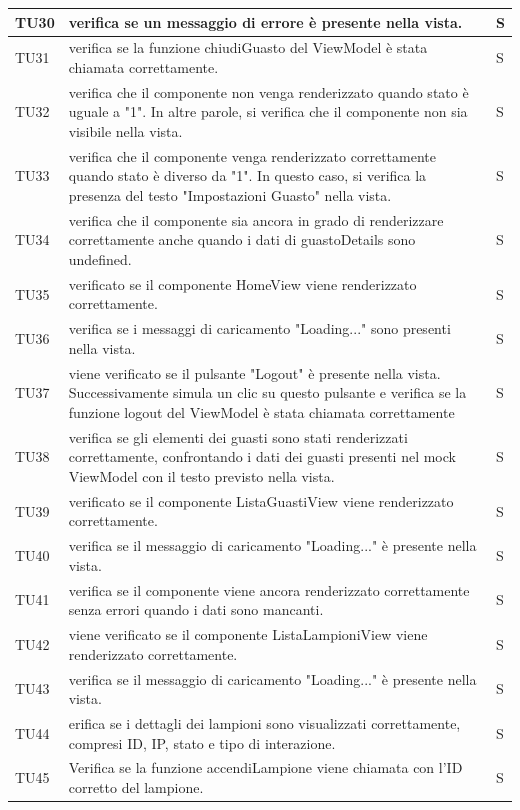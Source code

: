 \documentclass[12pt]{article}
\begin{document}
\begin{xltabular}{\linewidth}{|>{\hsize}X|X|>{\hsize}X|}
	TU30 & verifica se un messaggio di errore è presente nella vista. & S \\ \hline
	TU31 & verifica se la funzione chiudiGuasto del ViewModel è stata chiamata correttamente. & S \\ \hline
	TU32 & verifica che il componente non venga renderizzato quando stato è uguale a "1". In altre parole, si verifica che il componente non sia visibile nella vista. & S \\ \hline
	TU33 & verifica che il componente venga renderizzato correttamente quando stato è diverso da "1". In questo caso, si verifica la presenza del testo "Impostazioni Guasto" nella vista. & S \\ \hline
	TU34 & verifica che il componente sia ancora in grado di renderizzare correttamente anche quando i dati di guastoDetails sono undefined. & S \\ \hline
	TU35 & verificato se il componente HomeView viene renderizzato correttamente. & S \\ \hline
	TU36 & verifica se i messaggi di caricamento "Loading..." sono presenti nella vista. & S \\ \hline
	TU37 & viene verificato se il pulsante "Logout" è presente nella vista. Successivamente simula un clic su questo pulsante e verifica se la funzione logout del ViewModel è stata chiamata correttamente & S \\ \hline
	TU38 & verifica se gli elementi dei guasti sono stati renderizzati correttamente, confrontando i dati dei guasti presenti nel mock ViewModel con il testo previsto nella vista. & S \\ \hline
	TU39 & verificato se il componente ListaGuastiView viene renderizzato correttamente. & S \\ \hline
	TU40 &  verifica se il messaggio di caricamento "Loading..." è presente nella vista. & S \\ \hline
	TU41 & verifica se il componente viene ancora renderizzato correttamente senza errori quando i dati sono mancanti. & S \\ \hline
	TU42 & viene verificato se il componente ListaLampioniView viene renderizzato correttamente. & S \\ \hline
	TU43 & verifica se il messaggio di caricamento "Loading..." è presente nella vista. & S \\ \hline
	TU44 & erifica se i dettagli dei lampioni sono visualizzati correttamente, compresi ID, IP, stato e tipo di interazione. & S \\ \hline
	TU45 & Verifica se la funzione accendiLampione viene chiamata con l'ID corretto del lampione. & S \\ \hline

\end{xltabular}
\end{document}
